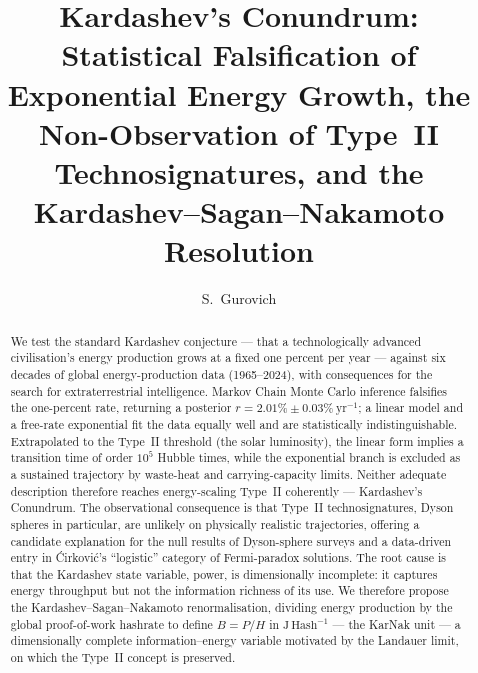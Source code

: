 \documentclass[preprint,12pt,authoryear]{elsarticle}
\begin{document}
\begin{frontmatter}

\title{Kardashev's Conundrum: Statistical Falsification of Exponential
Energy Growth, the Non-Observation of Type~II Technosignatures, and the
Kardashev--Sagan--Nakamoto Resolution}

\author[iate,wsu]{S.~Gurovich}

\address[iate]{Instituto de Astronom\'ia Te\'orica y Experimental
(IATE--OAC--UNC--CONICET), Laprida 854, X5000BGR, C\'ordoba, Argentina}

\address[wsu]{Western Sydney University, Kingswood campus, NSW, Australia}

\begin{abstract}
We test the standard Kardashev conjecture --- that a technologically advanced
civilisation's energy production grows at a fixed one percent per year --- against
six decades of global energy-production data (1965--2024), with consequences for
the search for extraterrestrial intelligence. Markov Chain Monte Carlo inference
falsifies the one-percent rate, returning a posterior
$r=2.01\%\pm0.03\%~\mathrm{yr^{-1}}$; a linear model and a free-rate exponential fit
the data equally well and are statistically indistinguishable. Extrapolated to the
Type~II threshold (the solar luminosity), the linear form implies a transition time
of order $10^5$ Hubble times, while the exponential branch is excluded as a
sustained trajectory by waste-heat and carrying-capacity limits. Neither adequate
description therefore reaches energy-scaling Type~II coherently --- Kardashev's
Conundrum. The observational consequence is that Type~II technosignatures, Dyson
spheres in particular, are unlikely on physically realistic trajectories, offering a
candidate explanation for the null results of Dyson-sphere surveys and a data-driven
entry in {\'C}irkovi{\'c}'s ``logistic'' category of Fermi-paradox solutions. The
root cause is that the Kardashev state variable, power, is dimensionally incomplete:
it captures energy throughput but not the information richness of its use. We
therefore propose the Kardashev--Sagan--Nakamoto renormalisation, dividing energy
production by the global proof-of-work hashrate to define $B=P/H$ in
$\mathrm{J\,Hash^{-1}}$ --- the KarNak unit --- a dimensionally complete
information--energy variable motivated by the Landauer limit, on which the Type~II
concept is preserved.
\end{abstract}


\end{frontmatter}
\end{document}
